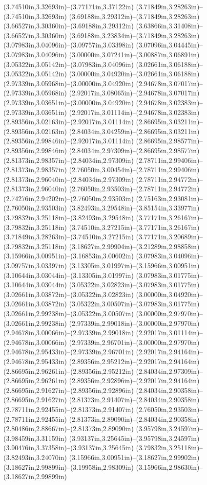 (3.74510in,3.32693in)--(3.77171in,3.37122in) (3.71849in,3.28263in)--(3.74510in,3.32693in) (3.69188in,3.29312in)--(3.71849in,3.28263in) (3.66527in,3.30360in)--(3.69188in,3.29312in) (3.63866in,3.31408in)--(3.66527in,3.30360in) (3.69188in,3.23834in)--(3.71849in,3.28263in) (3.07983in,3.04096in)--(3.09757in,3.03398in) (3.07096in,3.04445in)--(3.07983in,3.04096in) (3.00000in,3.07241in)--(3.00887in,3.06891in) (3.05322in,3.05142in)--(3.07983in,3.04096in) (3.02661in,3.06188in)--(3.05322in,3.05142in) (3.00000in,3.04920in)--(3.02661in,3.06188in) (2.97339in,3.05968in)--(3.00000in,3.04920in) (2.94678in,3.07017in)--(2.97339in,3.05968in) (2.92017in,3.08065in)--(2.94678in,3.07017in) (2.97339in,3.03651in)--(3.00000in,3.04920in) (2.94678in,3.02383in)--(2.97339in,3.03651in) (2.92017in,3.01114in)--(2.94678in,3.02383in) (2.89356in,3.02163in)--(2.92017in,3.01114in) (2.86695in,3.03211in)--(2.89356in,3.02163in) (2.84034in,3.04259in)--(2.86695in,3.03211in) (2.89356in,2.99846in)--(2.92017in,3.01114in) (2.86695in,2.98577in)--(2.89356in,2.99846in) (2.84034in,2.97309in)--(2.86695in,2.98577in) (2.81373in,2.98357in)--(2.84034in,2.97309in) (2.78711in,2.99406in)--(2.81373in,2.98357in) (2.76050in,3.00454in)--(2.78711in,2.99406in) (2.81373in,2.96040in)--(2.84034in,2.97309in) (2.78711in,2.94772in)--(2.81373in,2.96040in) (2.76050in,2.93503in)--(2.78711in,2.94772in) (2.74276in,2.94202in)--(2.76050in,2.93503in) (2.75163in,2.93081in)--(2.76050in,2.93503in) (3.82493in,3.29548in)--(3.85154in,3.33977in) (3.79832in,3.25118in)--(3.82493in,3.29548in) (3.77171in,3.26167in)--(3.79832in,3.25118in) (3.74510in,3.27215in)--(3.77171in,3.26167in) (3.71849in,3.28263in)--(3.74510in,3.27215in) (3.77171in,3.20689in)--(3.79832in,3.25118in) (3.18627in,2.99904in)--(3.21289in,2.98858in) (3.15966in,3.00951in)--(3.16853in,3.00602in) (3.07983in,3.04096in)--(3.09757in,3.03397in) (3.13305in,3.01997in)--(3.15966in,3.00951in) (3.10644in,3.03044in)--(3.13305in,3.01997in) (3.07983in,3.01775in)--(3.10644in,3.03044in) (3.05322in,3.02823in)--(3.07983in,3.01775in) (3.02661in,3.03872in)--(3.05322in,3.02823in) (3.00000in,3.04920in)--(3.02661in,3.03872in) (3.05322in,3.00507in)--(3.07983in,3.01775in) (3.02661in,2.99238in)--(3.05322in,3.00507in) (3.00000in,2.97970in)--(3.02661in,2.99238in) (2.97339in,2.99018in)--(3.00000in,2.97970in) (2.94678in,3.00066in)--(2.97339in,2.99018in) (2.92017in,3.01114in)--(2.94678in,3.00066in) (2.97339in,2.96701in)--(3.00000in,2.97970in) (2.94678in,2.95433in)--(2.97339in,2.96701in) (2.92017in,2.94164in)--(2.94678in,2.95433in) (2.89356in,2.95212in)--(2.92017in,2.94164in) (2.86695in,2.96261in)--(2.89356in,2.95212in) (2.84034in,2.97309in)--(2.86695in,2.96261in) (2.89356in,2.92896in)--(2.92017in,2.94164in) (2.86695in,2.91627in)--(2.89356in,2.92896in) (2.84034in,2.90358in)--(2.86695in,2.91627in) (2.81373in,2.91407in)--(2.84034in,2.90358in) (2.78711in,2.92455in)--(2.81373in,2.91407in) (2.76050in,2.93503in)--(2.78711in,2.92455in) (2.81373in,2.89090in)--(2.84034in,2.90358in) (2.80486in,2.88667in)--(2.81373in,2.89090in) (3.95798in,3.24597in)--(3.98459in,3.31159in) (3.93137in,3.25645in)--(3.95798in,3.24597in) (3.90476in,3.37358in)--(3.93137in,3.25645in) (3.79832in,3.25118in)--(3.82493in,3.24070in) (3.15966in,3.00951in)--(3.18627in,2.99902in) (3.18627in,2.99899in)--(3.19958in,2.98309in) (3.15966in,2.98630in)--(3.18627in,2.99899in) 